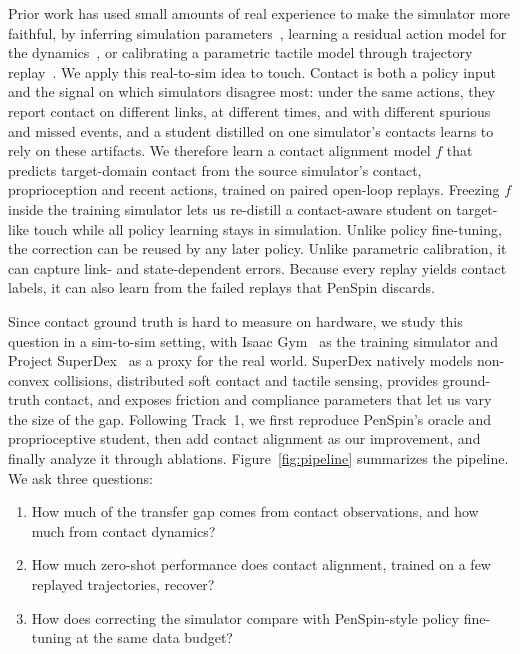 \documentclass{article}
\begin{document}
Prior work has used small amounts of real experience to make the simulator more faithful, by inferring simulation parameters~\citep{chebotar2019closing,ramos2019bayessim}, learning a residual action model for the dynamics~\citep{he2025asap}, or calibrating a parametric tactile model through trajectory replay~\citep{real2sim2real2026}. We apply this real-to-sim idea to touch. Contact is both a policy input and the signal on which simulators disagree most: under the same actions, they report contact on different links, at different times, and with different spurious and missed events, and a student distilled on one simulator's contacts learns to rely on these artifacts. We therefore learn a contact alignment model $f$ that predicts target-domain contact from the source simulator's contact, proprioception and recent actions, trained on paired open-loop replays. Freezing $f$ inside the training simulator lets us re-distill a contact-aware student on target-like touch while all policy learning stays in simulation. Unlike policy fine-tuning, the correction can be reused by any later policy. Unlike parametric calibration, it can capture link- and state-dependent errors. Because every replay yields contact labels, it can also learn from the failed replays that PenSpin discards.

Since contact ground truth is hard to measure on hardware, we study this question in a sim-to-sim setting, with Isaac Gym~\citep{makoviychuk2021isaac} as the training simulator and Project SuperDex~\citep{superdex2026} as a proxy for the real world. SuperDex natively models non-convex collisions, distributed soft contact and tactile sensing, provides ground-truth contact, and exposes friction and compliance parameters that let us vary the size of the gap. Following Track~1, we first reproduce PenSpin's oracle and proprioceptive student, then add contact alignment as our improvement, and finally analyze it through ablations. Figure~\ref{fig:pipeline} summarizes the pipeline. We ask three questions:
\begin{enumerate}[label=\textbf{RQ\arabic*:},leftmargin=*]
  \item How much of the transfer gap comes from contact observations, and how much from contact dynamics?
  \item How much zero-shot performance does contact alignment, trained on a few replayed trajectories, recover?
  \item How does correcting the simulator compare with PenSpin-style policy fine-tuning at the same data budget?
\end{enumerate}
\end{document}
